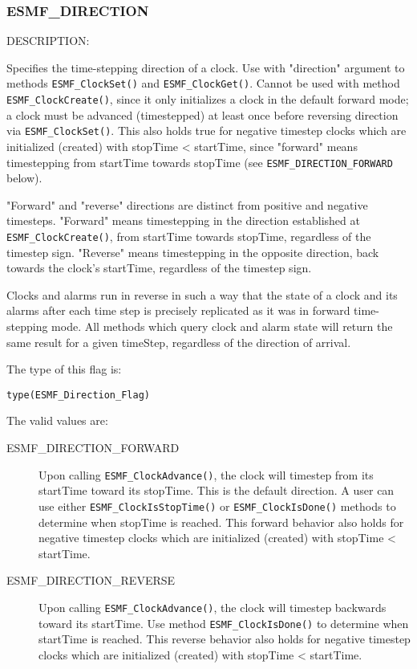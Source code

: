 
\subsubsection{ESMF\_DIRECTION}
\label{const:direction}

{\sf DESCRIPTION:\\}
\begin{sloppypar}
Specifies the time-stepping direction of a clock.  Use with "direction"
argument to methods {\tt ESMF\_ClockSet()} and {\tt ESMF\_ClockGet()}.
Cannot be used with method {\tt ESMF\_ClockCreate()}, since it only
initializes a clock in the default forward mode; a clock must be advanced
(timestepped) at least once before reversing direction via
{\tt ESMF\_ClockSet()}.  This also holds true for negative timestep clocks
which are initialized (created) with stopTime < startTime, since "forward"
means timestepping from startTime towards stopTime
(see {\tt ESMF\_DIRECTION\_FORWARD} below).
\end{sloppypar}

"Forward" and "reverse" directions are distinct from positive and negative
timesteps.  "Forward" means timestepping in the direction established at
{\tt ESMF\_ClockCreate()}, from startTime towards stopTime, regardless
of the timestep sign.  "Reverse" means timestepping in the opposite direction,
back towards the clock's startTime, regardless of the timestep sign.

Clocks and alarms run in reverse in such a way that the state of a clock and
its alarms after each time step is precisely replicated as it was in forward
time-stepping mode.  All methods which query clock and alarm state will
return the same result for a given timeStep, regardless of the direction of
arrival.

The type of this flag is:

{\tt type(ESMF\_Direction\_Flag)}

The valid values are:
\begin{description}

\item [ESMF\_DIRECTION\_FORWARD] 
      Upon calling {\tt ESMF\_ClockAdvance()}, the clock will timestep from
its startTime toward its stopTime.  This is the default direction.  A user
can use either {\tt ESMF\_ClockIsStopTime()} or {\tt ESMF\_ClockIsDone()}
methods to determine when stopTime is reached.  This forward behavior also
holds for negative timestep clocks which are initialized (created) with
stopTime < startTime.

\item [ESMF\_DIRECTION\_REVERSE] 
      Upon calling {\tt ESMF\_ClockAdvance()}, the clock will timestep backwards
toward its startTime.  Use method {\tt ESMF\_ClockIsDone()} to determine when
startTime is reached.  This reverse behavior also holds for negative timestep
clocks which are initialized (created) with stopTime < startTime.

\end{description}

